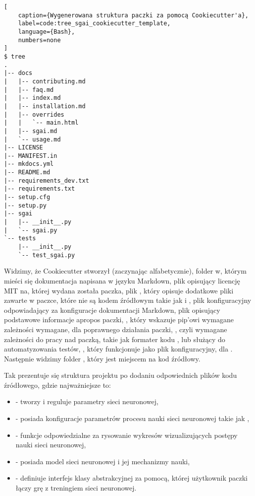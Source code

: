 \begin{onepage}
    \begin{lstlisting}[
    caption={Wygenerowana struktura paczki za pomocą Cookiecutter'a},
    label=code:tree_sgai_cookiecutter_template,
    language={Bash},
    numbers=none
]
$ tree
.
|-- docs
|   |-- contributing.md
|   |-- faq.md
|   |-- index.md
|   |-- installation.md
|   |-- overrides
|   |   `-- main.html
|   |-- sgai.md
|   `-- usage.md
|-- LICENSE
|-- MANIFEST.in
|-- mkdocs.yml
|-- README.md
|-- requirements_dev.txt
|-- requirements.txt
|-- setup.cfg
|-- setup.py
|-- sgai
|   |-- __init__.py
|   `-- sgai.py
`-- tests
    |-- __init__.py
    `-- test_sgai.py
    \end{lstlisting}
\end{onepage}


Widzimy, że Cookiecutter stworzył (zaczynając alfabetycznie), folder  w, którym mieści się dokumentacja napisana w języku Markdown, plik  opisujący licencję MIT \cite{LicencjaMIT} na, której wydana została paczka, plik , który opisuje dodatkowe pliki zawarte w paczce, które nie są kodem źródłowym takie jak  i , plik konfiguracyjny  odpowiadający za konfiguracje dokumentacji Markdown, plik  opisujący podstawowe informacje apropos paczki, , który wskazuje pip'owi wymagane zależności wymagane, dla poprawnego działania paczki, , czyli wymagane zależności do pracy nad paczką, takie jak formater kodu , lub  służący do automatyzowania testów, , który funkcjonuje jako plik konfiguracyjny, dla .
Następnie widzimy folder , który jest miejscem na kod źródłowy.


\clearpage

Tak prezentuje się struktura projektu po dodaniu odpowiednich plików kodu źródłowego, gdzie najważniejsze to:

\begin{itemize}
    \item {} - tworzy i reguluje parametry sieci neuronowej,
    \item {} - posiada konfiguracje parametrów procesu nauki sieci neuronowej takie jak ,
    \item {} - funkcje odpowiedzialne za rysowanie wykresów wizualizujących postępy nauki sieci neuronowej,
    \item {} - posiada model sieci neuronowej i jej mechanizmy nauki,
    \item {} - definiuje interfejs klasy abstrakcyjnej za pomocą, której użytkownik paczki łączy grę z treningiem sieci neuronowej.
\end{itemize}

